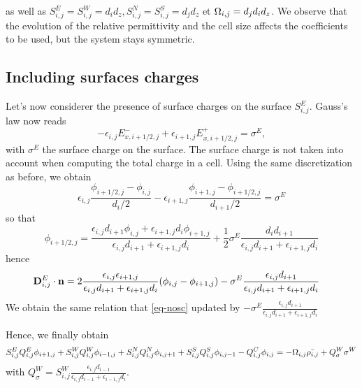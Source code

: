     as well as $S^E_{i,j} = S^W_{i,j} =d_id_z, S^N_{i,j} = S^S_{i,j}= d_jd_z$ et $\Omega_{i,j} = d_jd_id_z$.
    We observe that the evolution of the relative permittivity and the cell size affects the coefficients to be used, but the system stays symmetric.

    \subsection{Including surfaces charges}
    Let's now considerer the presence of surface charges on the surface $S^E_{i,j}$.
    Gauss's law now reads
    \begin{equation} \label{eq-gausslawsc}
      -\epsilon_{i,j}E_{x, i+1/2,j}^- + \epsilon_{i+1,j}E_{x, i+1/2,j}^+ =\sigma^E,
    \end{equation}
    with $\sigma^E$ the surface charge on the surface.
    The surface charge is not taken into account when computing the total charge in a cell.
    Using the same discretization as before, we obtain
    \begin{equation}
    \epsilon_{i,j} \frac{\phi_{i+1/2,j} - \phi_{i,j}}{d_i/2} - \epsilon_{i+1,j} \frac{\phi_{i+1,j} - \phi_{i+1/2,j}}{d_{i+1}/2} = \sigma^E
    \end{equation}
    so that
    \begin{equation}
      \label{eq-phidemi}
    \phi_{i+1/2,j} = \frac{\epsilon_{i,j} d_{i+1} \phi_{i,j} + \epsilon_{i+1,j} d_{i} \phi_{i+1,j} }{\epsilon_{i,j} d_{i+1} + \epsilon_{i+1,j} d_{i} } + \frac{1}{2}\sigma^E \frac{d_i d_{i+1}}{\epsilon_{i,j} d_{i+1} + \epsilon_{i+1,j} d_{i}}
    \end{equation}
    hence
    \begin{align*}
    {\mathbf D}^E_{i,j} \cdot {\mathbf n} &= 2\frac{\epsilon_{i,j}\epsilon_{i+1,j}}{\epsilon_{i,j}d_{i+1} + \epsilon_{i+1,j} d_i} (\phi_{i,j}-\phi_{i+1,j}) - \sigma^E \frac{\epsilon_{i,j}d_{i+1}}{\epsilon_{i,j}d_{i+1}+\epsilon_{i+1,j}d_{i}}
    \end{align*}
    We obtain the same relation that \cref{eq-nosc} updated by $- \sigma^E \frac{\epsilon_{i,j}d_{i+1}}{\epsilon_{i,j}d_{i+1}+\epsilon_{i+1,j}d_{i}}$

    Hence, we finally obtain
    \begin{equation}
    S^E_{i,j} Q^E_{i,j} \phi_{i+1,j} + S^W_{i,j} Q^W_{i,j} \phi_{i-1,j} + S^N_{i,j} Q^N_{i,j} \phi_{i,j+1} + S^S_{i,j} Q^S_{i,j} \phi_{i,j-1} - Q^C_{i,j} \phi_{i,j} = - \Omega_{i,j} \bar{\rho_{i,j}} + Q^W_{\sigma} \sigma^W
    \end{equation}
    with $Q^W_{\sigma} =  S^W_{i,j} \frac{\epsilon_{i,j}d_{i-1}}{\epsilon_{i,j}d_{i-1}+\epsilon_{i-1,j}d_{i}}$.



